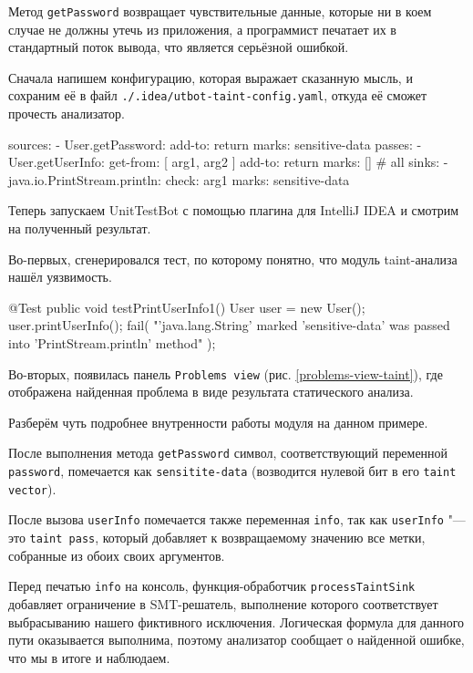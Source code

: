Метод \verb|getPassword| возвращает чувствительные данные, которые ни в коем случае не должны утечь из приложения, а программист печатает их в стандартный поток вывода, что является серьёзной ошибкой.

Сначала напишем конфигурацию, которая выражает сказанную мысль, и сохраним её в файл \verb|./.idea/utbot-taint-config.yaml|, откуда её сможет прочесть анализатор.

\begin{nocode}
sources:
  - User.getPassword:
      add-to: return
      marks: sensitive-data
passes:
  - User.getUserInfo:
      get-from: [ arg1, arg2 ]
      add-to: return
      marks: [] # all
sinks:
  - java.io.PrintStream.println:
      check: arg1
      marks: sensitive-data
\end{nocode}

Теперь запускаем UnitTestBot с помощью плагина для IntelliJ IDEA и смотрим на полученный результат.

Во-первых, сгенерировался тест, по которому понятно, что модуль taint-анализа нашёл уязвимость.

\begin{code}
@Test
public void testPrintUserInfo1() {
    User user = new User();
    user.printUserInfo();
    fail(
        "'java.lang.String' marked 'sensitive-data' 
         was passed into 'PrintStream.println' method"
    );
}
\end{code}

Во-вторых, появилась панель \verb|Problems view| (рис. \ref{problems-view-taint}), где отображена найденная проблема в виде результата статического анализа.

Разберём чуть подробнее внутренности работы модуля на данном примере.

После выполнения метода \verb|getPassword| символ, соответствующий переменной \verb|password|, помечается как \verb|sensitite-data| (возводится нулевой бит в его \verb|taint vector|).

После вызова \verb|userInfo| помечается также переменная \verb|info|, так как \verb|userInfo| "--- это \verb|taint pass|, который добавляет к возвращаемому значению все метки, собранные из обоих своих аргументов.

Перед печатью \verb|info| на консоль, функция-обработчик \verb|processTaintSink| добавляет ограничение в SMT-решатель, выполнение которого соответствует выбрасыванию нашего фиктивного исключения. Логическая формула для данного пути оказывается выполнима, поэтому анализатор сообщает о найденной ошибке, что мы в итоге и наблюдаем.
